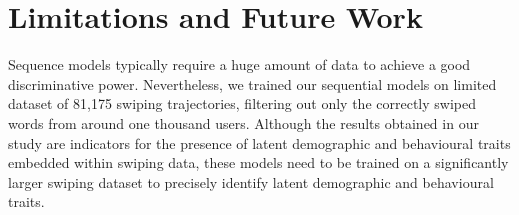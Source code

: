 \documentclass[11pt,oneside,a4paper,openright]{book}
\begin{document}
\newline
\begin{table}[]
\centering
{}
\caption{Results}
\label{tab:results}
\end{table}\newline





\chapter{Limitations and Future Work}

Sequence models typically require a huge amount of data to achieve a good discriminative power. Nevertheless, we trained our sequential models on limited dataset of 81,175 swiping trajectories, filtering out only the correctly swiped words from around one thousand users. Although the results obtained in our study are indicators for the presence of latent demographic and behavioural traits embedded within swiping data, these models need to be trained on a significantly larger swiping dataset to precisely identify latent demographic and behavioural traits.\\
\end{document}
